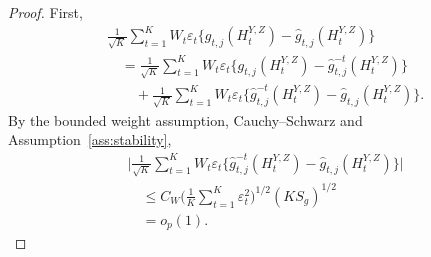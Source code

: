 \documentclass[12pt]{article}
\numberwithin{equation}{section}
\begin{document}
\begin{proof}
First,
\begin{align*}
&\frac1{\sqrt K}\sum_{t=1}^K W_t\varepsilon_t
\big\{g_{t,j}(H_t^{Y,Z})-\hat g_{t,j}(H_t^{Y,Z})\big\}\\
&\quad=\frac1{\sqrt K}\sum_{t=1}^K W_t\varepsilon_t
\big\{g_{t,j}(H_t^{Y,Z})-\hat g_{t,j}^{-t}(H_t^{Y,Z})\big\}\\
&\qquad{}+\frac1{\sqrt K}\sum_{t=1}^K W_t\varepsilon_t
\big\{\hat g_{t,j}^{-t}(H_t^{Y,Z})-\hat g_{t,j}(H_t^{Y,Z})\big\}.
\end{align*}
By the bounded weight assumption, Cauchy--Schwarz and
Assumption~\ref{ass:stability},
\begin{equation}
\label{eq:exposure-first-deletion-bound}
\begin{aligned}
&\Big|\frac1{\sqrt K}\sum_{t=1}^K W_t\varepsilon_t
\big\{\hat g_{t,j}^{-t}(H_t^{Y,Z})
      -\hat g_{t,j}(H_t^{Y,Z})\big\}\Big|\\
&\quad\leq C_W
\Big(\frac1K\sum_{t=1}^K\varepsilon_t^2\Big)^{1/2}
(KS_g)^{1/2}\\
&\quad=o_p(1).
\end{aligned}
\end{equation}


\end{proof}
\end{document}
